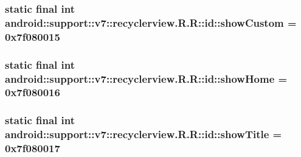 \hypertarget{classandroid_1_1support_1_1v7_1_1recyclerview_1_1_r_1_1id_ad1568a10b7e189c8cf1df6acc51a58e}{
\subsubsection[{showCustom}]{\setlength{\rightskip}{0pt plus 5cm}static final int android::support::v7::recyclerview.R.R::id::showCustom = 0x7f080015}}
\label{classandroid_1_1support_1_1v7_1_1recyclerview_1_1_r_1_1id_ad1568a10b7e189c8cf1df6acc51a58e}


\hypertarget{classandroid_1_1support_1_1v7_1_1recyclerview_1_1_r_1_1id_eafd37d75c104153d0448e732e734b87}{
\subsubsection[{showHome}]{\setlength{\rightskip}{0pt plus 5cm}static final int android::support::v7::recyclerview.R.R::id::showHome = 0x7f080016}}
\label{classandroid_1_1support_1_1v7_1_1recyclerview_1_1_r_1_1id_eafd37d75c104153d0448e732e734b87}


\hypertarget{classandroid_1_1support_1_1v7_1_1recyclerview_1_1_r_1_1id_c461d5c1f707b6ef6fc3d8dfecb46442}{
\subsubsection[{showTitle}]{\setlength{\rightskip}{0pt plus 5cm}static final int android::support::v7::recyclerview.R.R::id::showTitle = 0x7f080017}}
\label{classandroid_1_1support_1_1v7_1_1recyclerview_1_1_r_1_1id_c461d5c1f707b6ef6fc3d8dfecb46442}


